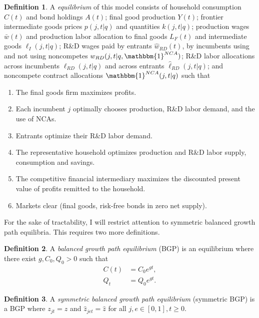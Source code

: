 \documentclass[11pt,english]{article}
\theoremstyle{definition}
\newtheorem{definition}{Definition}
\begin{document}
\theoremstyle{definition}
\begin{definition}
	A \emph{equilibrium} of this model consists of household consumption $C(t)$ and bond holdings $A(t)$; final good production $Y(t)$; frontier intermediate goods prices $p(j,t|q)$ and quantities $k(j,t|q)$; production wages $\bar{w}(t)$ and production labor allocation to final goods $L_{F}(t)$ and intermediate goods $\ell_I(j,t|q)$; R\&D wages paid by entrants $\hat{w}_{RD}(t)$, by incumbents using and not using noncompetes $w_{RD}(j,t|q,\mathbbm{1}^{NCA})$; R\&D labor allocations across incumbents $\ell_{RD}(j,t|q)$ and across entrants $\hat{\ell}_{RD}(j,t|q)$; and noncompete contract allocations $\mathbbm{1}^{NCA}(j,t|q)$ such that 
	\begin{enumerate}
		\item The final goods firm maximizes profits.
		\item Each incumbent $j$ optimally chooses production, R\&D labor demand, and the use of NCAs.
		\item Entrants optimize their R\&D labor demand.
		\item The representative household optimizes production and R\&D labor supply, consumption and savings.
		\item The competitive financial intermediary maximizes the discounted present value of profits remitted to the household.
		\item Markets clear (final goods, risk-free bonds in zero net supply).
	\end{enumerate}
\end{definition}

For the sake of tractability, I will restrict attention to symmetric balanced growth path equilibria. This requires two more definitions.

\theoremstyle{definition}
\begin{definition}
	A \emph{balanced growth path equilibrium} (BGP) is an equilibrium where there exist $g, C_0, Q_0 > 0$ such that
	\begin{align*}
		C(t) &= C_0 e^{gt}, \\
		Q_t &= Q_0 e^{gt}.
	\end{align*}
\end{definition}

\theoremstyle{definition}
\begin{definition}
	A \emph{symmetric balanced growth path equilibrium} (symmetric BGP) is a BGP where $z_{jt} = z$ and $\hat{z}_{jet} = \hat{z}$ for all $j,e \in [0,1], t \ge 0$. 
\end{definition}
\end{document}
